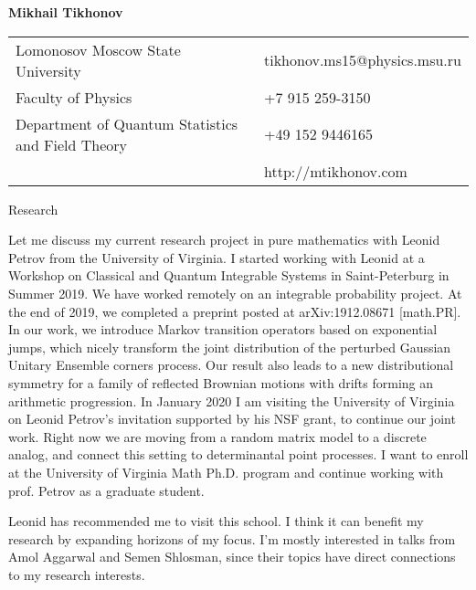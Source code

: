 \documentclass[letterpaper,10pt,oneside,utf8]{article}
\begin{document}
\newpage
	\noindent  \LARGE{\textbf{Mikhail Tikhonov}}  \\
\vspace{-2ex}
\normalsize
	\begin{center}
	\begin{tabular}{l l}
		Lomonosov Moscow State University   & \hspace{1in} 
		{tikhonov.ms15@physics.msu.ru} \\
		Faculty of Physics   & \hspace{1in} +7 915 259-3150 \\
		Department of Quantum Statistics and Field Theory         &\hspace{1in} +49 152 9446165  \\
		& \hspace{1in} http://mtikhonov.com \\
	\end{tabular}
\end{center}
\Large{Research}

	Let me  discuss my current research project in pure mathematics with Leonid Petrov from the University of Virginia. I started working with Leonid at a Workshop on Classical and Quantum Integrable Systems in Saint-Peterburg in Summer 2019.  We have worked remotely on an integrable probability project. At the end of 2019, we completed a preprint posted at arXiv:1912.08671 [math.PR]. In our work, we introduce Markov transition operators based on exponential jumps, which nicely transform the joint distribution of the perturbed Gaussian Unitary Ensemble corners process. Our result also leads to a new distributional symmetry for a family of reflected Brownian motions with drifts forming an arithmetic progression. In January 2020 I am visiting the University of Virginia on Leonid Petrov's invitation supported by his NSF grant, to continue our joint work. Right now we are moving from a random matrix model to a discrete analog, and connect this setting to determinantal point processes.  I want to enroll at the University of Virginia Math Ph.D. program and continue working with prof. Petrov as a graduate student.
	
	Leonid has recommended me to visit this school. I think it can benefit my research by expanding horizons of my focus. I'm mostly interested in talks from Amol Aggarwal and Semen Shlosman, since their topics have direct connections to my research interests. 
\end{document}
